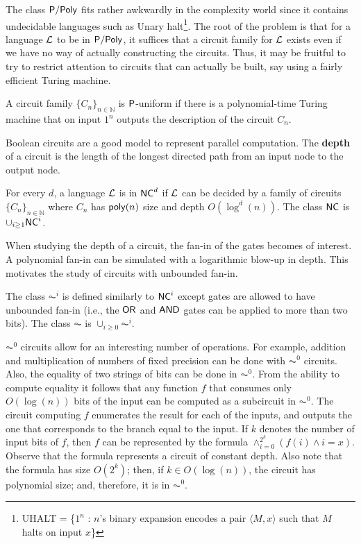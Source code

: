 The class $\mathsf{P/Poly}$ fits rather awkwardly in the complexity world since it contains undecidable languages such as Unary halt\footnote{UHALT = \{$1^n$ : $n$'s binary expansion encodes a pair $\langle M, x \rangle$ such that $M$ halts on input $x$\}}. 
The root of the problem is that for a language $\mathcal{L}$ to be in $\mathsf{P/Poly}$, it suffices that a circuit family for $\mathcal{L}$ exists even if we have no way of actually constructing the circuits.
Thus, it may be fruitful to try to restrict attention to circuits that can actually be built, say using a fairly efficient Turing machine.


\begin{definition}
    A circuit family $\{C_n\}_{n\in\mathbb{N}}$ is $\mathsf{P}$-uniform if there is a polynomial-time Turing machine that on input $1^n$ outputs the description of the circuit $C_n$.
\end{definition}

\bigskip

Boolean circuits are a good model to represent parallel computation.
The \textbf{depth} of a circuit is the length of the longest directed path from an input node to the output node.

\begin{definition}[$\NC$]
    For every $d$, a language $\mathcal{L}$ is in $\mathsf{NC}^d$ if $\mathcal{L}$ can be decided by a family of circuits $\{C_n\}_{n\in\mathbb{N}}$ where $C_n$ has $\mathsf{poly}(n)$ size and depth $O(\log^d(n))$. 
    The class $\NC$ is $\cup_{i \geq 1}\mathsf{NC}^i$.
\end{definition}

When studying the depth of a circuit, the fan-in of the gates becomes of interest.
A polynomial fan-in can be simulated with a logarithmic blow-up in depth.
This motivates the study of circuits with unbounded fan-in.


\begin{definition}[$\AC$]
    The class $\AC^i$ is defined similarly to $\mathsf{NC}^i$ except gates are allowed to have unbounded fan-in (i.e., the $\mathsf{OR}$ and $\mathsf{AND}$ gates can be applied to more than two bits). 
    The class $\AC$ is $\cup_{i \geq 0}\AC^i$.
\end{definition}

$\AC^0$ circuits allow for an interesting number of operations.
For example, addition and multiplication of numbers of fixed precision can be done with $\AC^0$ circuits.
Also, the equality of two strings of bits can be done in $\AC^0$.
From the ability to compute equality it follows that any function $f$ that consumes only $O(\log(n))$ bits of the input can be computed as a subcircuit in $\AC^0$.
The circuit computing $f$ enumerates the result for each of the inputs, and outputs the one that corresponds to the branch equal to the input.
If $k$ denotes the number of input bits of $f$, then $f$ can be represented by the formula $\land_{i = 0}^{2^k} (f(i) \land i = x)$.
Observe that the formula represents a circuit of constant depth.
Also note that the formula has size $O(2^k)$; then, if $k \in O(\log(n))$, the circuit has polynomial size; and, therefore, it is in $\AC^0$.


